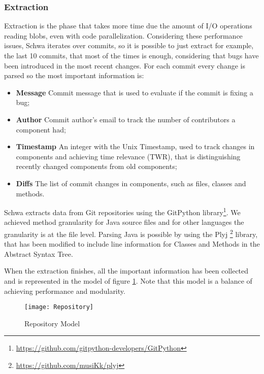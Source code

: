 \subsubsection{Extraction}
Extraction is the phase that takes more time due the amount of I/O operations reading blobs, even with code parallelization. Considering these performance issues, Schwa iterates over commits, so it is possible to just extract for example, the last 10 commits, that most of the times is enough, considering that bugs have been introduced in the most recent changes. For each commit every change is parsed so the most important information is:

\begin{itemize}
\item  \textbf{Message} Commit message that is used to evaluate if the commit is fixing a bug;
\item  \textbf{Author} Commit author's email to track the number of contributors a component had;
\item  \textbf{Timestamp} An integer with the Unix Timestamp, used to track changes in components and achieving time relevance (TWR), that is distinguishing recently changed components from old components;
\item  \textbf{Diffs} The list of commit changes in components, such as files, classes and methods.
\end{itemize}

Schwa extracts data from Git repositories using the GitPython library\footnote{\url{https://github.com/gitpython-developers/GitPython}}. We achieved method granularity for Java source files and for other languages the granularity is at the file level. Parsing Java is possible by using the Plyj \footnote{\url{https://github.com/musiKk/plyj}} library, that has been modified to include line information for Classes and Methods in the Abstract Syntax Tree.

When the extraction finishes, all the important information has been collected and is represented in the model of figure \ref{figure:repository_model}. Note that this model is a balance of achieving performance and modularity.

\begin{figure}[H]
    \begin{center}
        \texttt{[image: Repository]}
        \caption{Repository Model}
        \label{figure:repository_model}
    \end{center}
\end{figure}

